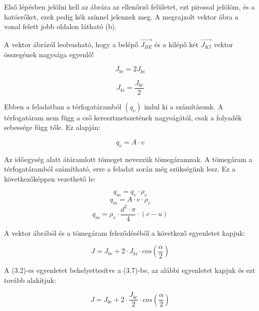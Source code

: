 \noindent Első lépésben jelölni kell az ábrára az ellenőrző felületet, ezt pirossal jelölöm, és a hatóerőket, ezek pedig kék színnel jelennek meg. A megrajzolt vektor ábra a vonal felett jobb oldalon látható (b).

\noindent A vektor ábráról leolvasható, hogy a belépő $\vec{J_{BE}}$ és a kilépő két $\vec{J_{KI}}$ vektor összegének nagysága egyenlő!

\begin{equation}
J_{be} = 2 J_{ki}
\end{equation}

\begin{equation}
J_{ki} = \frac{J_{be}}{2}
\end{equation}

\noindent Ebben a feladatban a térfogatáramból $(q_v)$ indul ki a számításunk. A térfogatáram nem függ a cső keresztmetszetének nagyságától, csak a folyadék sebessége függ tőle. Ez alapján:

\begin{equation}
q_v=A\cdot{v}
\end{equation}

\noindent Az időegység alatt átáramlott tömeget nevezzük tömegáramnak. A tömegáram a térfogatáramból számítható, erre a feladat során még szükségünk lesz. Ez a következőképpen vezethető le:

\begin{equation}
q_m=q_v\cdot{\rho_v}
\end{equation}
\begin{equation}
q_m=A\cdot{v}\cdot{\rho_v}
\end{equation}
\begin{equation}
q_m={\rho_v}\cdot{\frac{d^2\cdot{\pi}}{4}}\cdot(c-u)
\end{equation}


\noindent A vektor ábrából és a tömegáram feleződéséből a következő egyenletet kapjuk:

\begin{equation}
J=J_{be}+2\cdot{J_{ki}\cdot{cos\left(\frac{\alpha}{2}\right)}}
\end{equation}

\noindent A (3.2)-es egyenletet behelyettesítve a (3.7)-be, az alábbi egyenletet kapjuk és ezt tovább alakítjuk:

\begin{equation}
J=J_{be}+2\cdot\frac{J_{be}}{2}\cdot{cos\left(\frac{\alpha}{2}\right)}
\end{equation}

